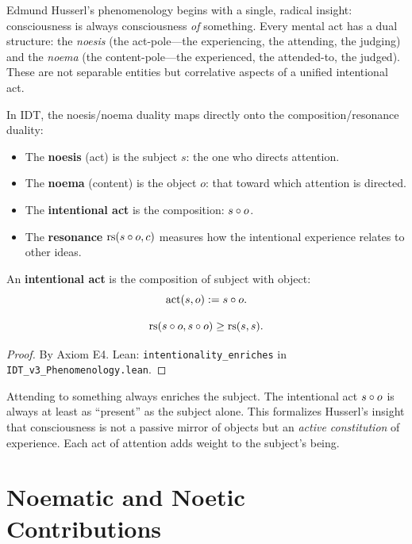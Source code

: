 Edmund Husserl's phenomenology begins with a single, radical insight:
consciousness is always consciousness \emph{of} something. Every mental act
has a dual structure: the \textit{noesis} (the act-pole---the experiencing, the
attending, the judging) and the \textit{noema} (the content-pole---the
experienced, the attended-to, the judged). These are not separable entities but
correlative aspects of a unified intentional act.

In IDT, the noesis/noema duality maps directly onto the composition/resonance
duality:
\begin{itemize}
\item The \textbf{noesis} (act) is the subject $s$: the one who directs attention.
\item The \textbf{noema} (content) is the object $o$: that toward which attention
is directed.
\item The \textbf{intentional act} is the composition: $s \circ o$.
\item The \textbf{resonance} $\mathrm{rs}(s \circ o, c)$ measures how the intentional
experience relates to other ideas.
\end{itemize}

\begin{definition}
\label{def:intentional-act}
An \textbf{intentional act} is the composition of subject with object:
\[
\mathrm{act}(s, o) := s \circ o.
\]
\end{definition}

\begin{theorem}
\label{thm:intentionality-enriches}
\[
\mathrm{rs}(s \circ o, s \circ o) \geq \mathrm{rs}(s, s).
\]
\end{theorem}

\begin{proof}
By Axiom E4.
Lean: \texttt{intentionality\_enriches} in \texttt{IDT\_v3\_Phenomenology.lean}.
\end{proof}

\begin{interpretation}
Attending to something always enriches the subject. The intentional act
$s \circ o$ is always at least as ``present'' as the subject alone. This
formalizes Husserl's insight that consciousness is not a passive mirror of
objects but an \emph{active constitution} of experience. Each act of attention
adds weight to the subject's being.
\end{interpretation}

\section{Noematic and Noetic Contributions}

